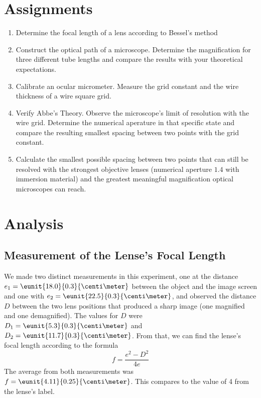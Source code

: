 \documentclass[a4paper,10pt]{article}
\begin{document}
\section{Assignments}
\begin{enumerate}
\item Determine the focal length of a lens according to Bessel's method
\item Construct the optical path of a microscope. Determine the magnification for three different tube lengths and compare the results with your theoretical expectations.
\item Calibrate an ocular micrometer. Measure the grid constant and the wire thickness of a wire square grid.
\item Verify Abbe's Theory. Observe the microscope's limit of resolution with the wire grid. Determine the numerical aperature in that specific state and compare the resulting smallest spacing between two points with the grid constant.
\item Calculate the smallest possible spacing between two points that can still be resolved with the strongest objective lenses (numerical aperture $1.4$ with immersion material) and the greatest meaningful magnification optical microscopes can reach.
\end{enumerate}
\clearpage


\section{Analysis}

\subsection{Measurement of the Lense's Focal Length}
We made two distinct measurements in this experiment, one at the distance $e_1=\eunit{18.0}{0.3}{\centi\meter}$ between the object and the image screen and one with $e_2=\eunit{22.5}{0.3}{\centi\meter}$, and observed the distance $D$ between the two lens positions that produced a sharp image (one magnified and one demagnified). The values for $D$ were $D_1=\eunit{5.3}{0.3}{\centi\meter}$ and $D_2=\eunit{11.7}{0.3}{\centi\meter}$. From that, we can find the lense's focal length according to the formula
\begin{equation}
f=\frac{e^2-D^2}{4e} \label{eqfocallength}
\end{equation}
The average from both measurements was $f=\eunit{4.11}{0.25}{\centi\meter}$. This compares to the value of \unit{4}{\centi\meter} from the lense's label.
\end{document}
